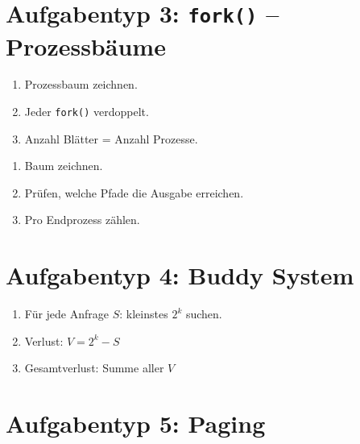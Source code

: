 \documentclass[a4paper,11pt]{article}
\begin{document}
\section{Aufgabentyp 3: \texttt{fork()} – Prozessbäume}

\begin{tcolorbox}[colback=bsybg,colframe=bsyred,title=\textbf{Rezept: Anzahl Prozesse}]
\begin{enumerate}
\item Prozessbaum zeichnen.
\item Jeder \texttt{fork()} verdoppelt.
\item Anzahl Blätter = Anzahl Prozesse.
\end{enumerate}
\end{tcolorbox}

\begin{tcolorbox}[colback=bsybg,colframe=bsygreen,title=\textbf{Rezept: Anzahl Ausgaben}]
\begin{enumerate}
\item Baum zeichnen.
\item Prüfen, welche Pfade die Ausgabe erreichen.
\item Pro Endprozess zählen.
\end{enumerate}
\end{tcolorbox}

\section{Aufgabentyp 4: Buddy System}

\begin{tcolorbox}[colback=bsybg,colframe=bsyblue,title=\textbf{Rezept: interne Fragmentierung}]
\begin{enumerate}
\item Für jede Anfrage \(S\): kleinstes \(2^k\) suchen.
\item Verlust: \(V = 2^k - S\)
\item Gesamtverlust: Summe aller \(V\)
\end{enumerate}
\end{tcolorbox}

\section{Aufgabentyp 5: Paging}
\end{document}
